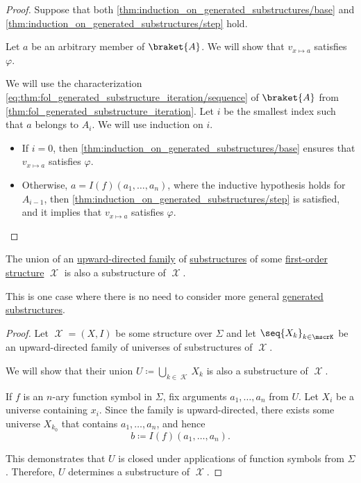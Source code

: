 \begin{proof}
  Suppose that both \cref{thm:induction_on_generated_substructures/base} and \cref{thm:induction_on_generated_substructures/step} hold.

  Let \( a \) be an arbitrary member of \( \braket{ A } \). We will show that \( v_{x \mapsto a} \) satisfies \( \varphi \).

  We will use the characterization \eqref{eq:thm:fol_generated_substructure_iteration/sequence} of \( \braket{ A } \) from \cref{thm:fol_generated_substructure_iteration}. Let \( i \) be the smallest index such that \( a \) belongs to \( A_i \). We will use induction on \( i \).

  \begin{itemize}
    \item If \( i = 0 \), then \cref{thm:induction_on_generated_substructures/base} ensures that \( v_{x \mapsto a} \) satisfies \( \varphi \).

    \item Otherwise, \( a = I(f)(a_1, \ldots, a_n) \), where the inductive hypothesis holds for \( A_{i-1} \), then \cref{thm:induction_on_generated_substructures/step} is satisfied, and it implies that \( v_{x \mapsto a} \) satisfies \( \varphi \).
  \end{itemize}
\end{proof}

\begin{proposition}\label{thm:fol_substructure_upward_directed_union}
  The union of an \hyperref[def:directed_set]{upward-directed family} of \hyperref[def:fol_substructure]{substructures} of some \hyperref[def:fol_structure]{first-order structure} \( \mscrX \) is also a substructure of \( \mscrX \).
\end{proposition}
\begin{comments}
  \item This is one case where there is no need to consider more general \hyperref[def:fol_generated_substructure]{generated substructures}.
\end{comments}
\begin{proof}
  Let \( \mscrX = (X, I) \) be some structure over \( \Sigma \) and let \( \seq{ X_k }_{k \in \mscrK} \) be an upward-directed family of universes of substructures of \( \mscrX \).

  We will show that their union \( U \coloneqq \bigcup_{k \in \mscrK} X_k \) is also a substructure of \( \mscrX \).

  If \( f \) is an \( n \)-ary function symbol in \( \Sigma \), fix arguments \( a_1, \ldots, a_n \) from \( U \). Let \( X_i \) be a universe containing \( x_i \). Since the family is upward-directed, there exists some universe \( X_{k_0} \) that contains \( a_1, \ldots, a_n \), and hence
  \begin{equation*}
    b \coloneqq I(f)(a_1, \ldots, a_n).
  \end{equation*}

  This demonstrates that \( U \) is closed under applications of function symbols from \( \Sigma \). Therefore, \( U \) determines a substructure of \( \mscrX \).
\end{proof}

